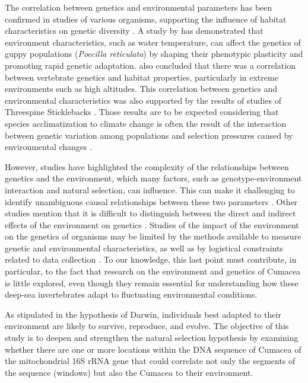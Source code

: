The correlation between genetics and environmental parameters has been confirmed in studies of various organisms, supporting the influence of habitat characteristics on genetic diversity \citep{colosimo_widespread_2005,cheviron_genomic_2012}. A study by \cite{ghalambor_adaptive_2007} has demonstrated that environment characteristics, such as water temperature, can affect the genetics of guppy populations (\emph{Poecilla reticulata}) by shaping their phenotypic plasticity and promoting rapid genetic adaptation. \cite{cheviron_genomic_2012} also concluded that there was a correlation between vertebrate genetics and habitat properties, particularly in extreme environments such as high altitudes. This correlation between genetics and environmental characteristics was also supported by the results of studies of Threespine Sticklebacks \citep{colosimo_widespread_2005}. Those results are to be expected considering that species acclimatization to climate change is often the result of the interaction between genetic variation among populations and selection pressures caused by environmental changes \citep{hoffmann_climate_2011}.

However, studies have highlighted the complexity of the relationships between genetics and the environment, which many factors, such as genotype-environment interaction and natural selection, can influence. This can make it challenging to identify unambiguous causal relationships between these two parameters \citep{balkenhol_identifying_2009}. Other studies mention that it is difficult to distinguish between the direct and indirect effects of the environment on genetics \citep{manel_perspectives_2010,balkenhol_landscape_2019}. Studies of the impact of the environment on the genetics of organisms may be limited by the methods available to measure genetic and environmental characteristics, as well as by logistical constraints related to data collection \citep{manel_perspectives_2010,shafer_widespread_2013}. To our knowledge, this last point must contribute, in particular, to the fact that research on the environment and genetics of Cumacea is little explored, even though they remain essential for understanding how these deep-sea invertebrates adapt to fluctuating environmental conditions. 

As stipulated in the hypothesis of Darwin, individuals best adapted to their environment are likely to survive, reproduce, and evolve. The objective of this study is to deepen and strengthen the natural selection hypothesis by examining whether there are one or more locations within the DNA sequence of Cumacea of the mitochondrial 16S rRNA gene that could correlate not only the segments of the sequence (windows) but also the Cumacea to their environment.

